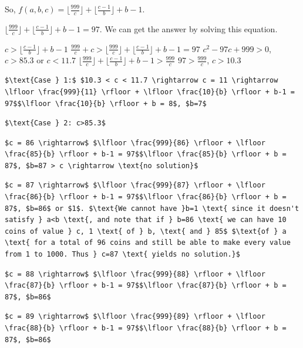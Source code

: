 \begin{enumerate}
 So, $f(a, b, c) = \lfloor \frac{999}{c} \rfloor + \lfloor \frac{c-1}{b} \rfloor + b-1$.

 $\lfloor \frac{999}{c} \rfloor + \lfloor \frac{c-1}{b} \rfloor + b-1 = 97$. We can get the answer by solving this equation.

 $c > \lfloor \frac{c-1}{b} \rfloor + b-1$
$\frac{999}{c} + c > \lfloor \frac{999}{c} \rfloor + \lfloor \frac{c-1}{b} \rfloor + b-1 = 97$
$c^2 - 97c + 999 > 0$, $c > 85.3$ or $c < 11.7$
$\lfloor \frac{999}{c} \rfloor + \lfloor \frac{c-1}{b} \rfloor + b-1 > \frac{999}{c}$
$97 > \frac{999}{c}$, $c>10.3$
\begin{verbatim}
$\text{Case } 1:$ $10.3 < c < 11.7 \rightarrow c = 11 \rightarrow \lfloor \frac{999}{11} \rfloor + \lfloor \frac{10}{b} \rfloor + b-1 = 97$$\lfloor \frac{10}{b} \rfloor + b = 8$, $b=7$
\end{verbatim}

\begin{verbatim}
$\text{Case } 2: c>85.3$
\end{verbatim}

\begin{verbatim}
$c = 86 \rightarrow$ $\lfloor \frac{999}{86} \rfloor + \lfloor \frac{85}{b} \rfloor + b-1 = 97$$\lfloor \frac{85}{b} \rfloor + b = 87$, $b=87 > c \rightarrow \text{no solution}$
\end{verbatim}

\begin{verbatim}
$c = 87 \rightarrow$ $\lfloor \frac{999}{87} \rfloor + \lfloor \frac{86}{b} \rfloor + b-1 = 97$$\lfloor \frac{86}{b} \rfloor + b = 87$, $b=86$ or $1$. $\text{We cannot have }b=1 \text{ since it doesn't satisfy } a<b \text{, and note that if } b=86 \text{ we can have 10 coins of value } c, 1 \text{ of } b, \text{ and } 85$ $\text{of } a \text{ for a total of 96 coins and still be able to make every value from 1 to 1000. Thus } c=87 \text{ yields no solution.}$
\end{verbatim}

\begin{verbatim}
$c = 88 \rightarrow$ $\lfloor \frac{999}{88} \rfloor + \lfloor \frac{87}{b} \rfloor + b-1 = 97$$\lfloor \frac{87}{b} \rfloor + b = 87$, $b=86$
\end{verbatim}

\begin{verbatim}
$c = 89 \rightarrow$ $\lfloor \frac{999}{89} \rfloor + \lfloor \frac{88}{b} \rfloor + b-1 = 97$$\lfloor \frac{88}{b} \rfloor + b = 87$, $b=86$
\end{verbatim}


\end{enumerate}
